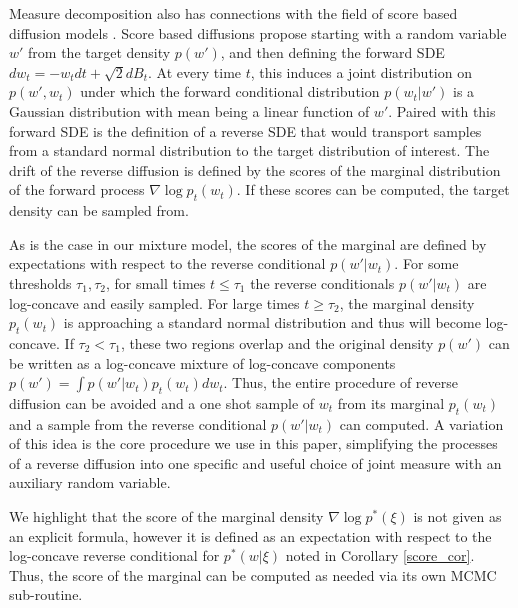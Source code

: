 \documentclass{article}
\numberwithin{equation}{section}
\theoremstyle{Lemma}
\theoremstyle{Corollary}
\theoremstyle{Theorem}
\theoremstyle{Remark}
\begin{document}
Measure decomposition also has connections with the field of score based diffusion models \cite{song2021scorebased}. Score based diffusions propose starting with a random variable $w'$ from the target density $p(w')$, and then defining the forward SDE $dw_{t}= -w_{t}dt+\sqrt{2}dB_{t}$. At every time $t$, this induces a joint distribution on $p(w', w_{t})$ under which the forward conditional distribution $p(w_{t}|w')$ is a Gaussian distribution with mean being a linear function of $w'$. Paired with this forward SDE is the definition of a reverse SDE that would transport samples from a standard normal distribution to the target distribution of interest. The drift of the reverse diffusion is defined by the scores of the marginal distribution of the forward process $\nabla \log p_{t}(w_{t})$. If these scores can be computed, the target density can be sampled from.

As is the case in our mixture model, the scores of the marginal are defined by expectations with respect to the reverse conditional $p(w'|w_{t})$. For some thresholds $\tau_{1}, \tau_{2}$, for small times $t \leq \tau_{1}$ the reverse conditionals $p(w'|w_{t})$ are log-concave and easily sampled. For large times $t \geq \tau_{2}$, the marginal density $p_{t}(w_{t})$ is approaching a standard normal distribution and thus will become log-concave. If $\tau_{2}< \tau_{1}$, these two regions overlap and the original density $p(w')$ can be written as a log-concave mixture of log-concave components $p(w')= \int p(w'|w_{t})p_{t}(w_{t})dw_{t}$. Thus, the entire procedure of reverse diffusion can be avoided and a one shot sample of $w_{t}$ from its marginal $p_{t}(w_{t})$ and a sample from the reverse conditional $p(w'|w_{t})$ can computed. A variation of this idea is the core procedure we use in this paper, simplifying the processes of a reverse diffusion into one specific and useful choice of joint measure with an auxiliary random variable.

We highlight that the score of the marginal density $\nabla \log p^{*}(\xi)$ is not given as an explicit formula, however it is defined as an expectation with respect to the log-concave reverse conditional for $p^{*}(w|\xi)$ noted in Corollary \ref{score_cor}. Thus, the score of the marginal can be computed as needed via its own MCMC sub-routine.
\end{document}
